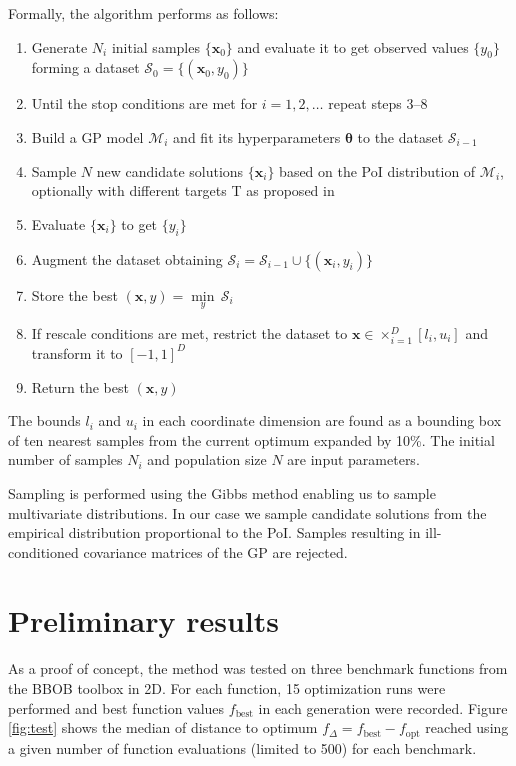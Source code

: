 \documentclass{sig-alternate}
\newcommand{\xx}{\mathrm{\mathbf{x}}}
\newcommand{\ttheta}{\mathbf{\theta}}
\begin{document}
Formally, the algorithm performs as follows:
\begin{enumerate}[itemsep=-4pt]
  \item Generate $N_i$ initial samples $\{\xx_0\}$ and evaluate it to get observed values $\{y_0\}$ forming a
    dataset $\mathcal{S}_0 = \{(\xx_0, y_0)\}$
  \item Until the stop conditions are met for $i = 1, 2, \dots$ repeat steps 3--8
  \item Build a GP model $\mathcal{M}_i$ and fit its hyperparameters $\ttheta$ to the dataset $\mathcal{S}_{i-1}$
  \item Sample $N$ new candidate solutions $\{\xx_i\}$ based on the PoI distribution of $\mathcal{M}_i$, 
    optionally with different targets T as proposed in \cite{jones01taxonomy}
  \item Evaluate $\{\xx_i\}$ to get $\{y_i\}$ 
  \item Augment the dataset obtaining $\mathcal{S}_i = \mathcal{S}_{i-1} \cup \{(\xx_i, y_i)\}$
  \item Store the best $(\xx, y) = \underset{y}{\min} \, \mathcal{S}_i$
  \item If rescale conditions are met, restrict the dataset to $\xx \in \times_{i=1}^D [l_i, u_i]$ and
    transform it to $[-1, 1]^D$
  \item Return the best $(\xx, y)$
\end{enumerate}
The bounds $l_i$ and $u_i$ in each coordinate dimension are found as a bounding box of ten nearest samples 
from the current optimum expanded by 10\%. The initial number of samples $N_i$ and population size $N$ are 
input parameters.

Sampling is performed using the Gibbs method \cite{geman1984stochastic} enabling us to sample multivariate 
distributions. In our case we sample candidate solutions from  the empirical distribution proportional to 
the PoI. Samples resulting in ill-con\-di\-tion\-ed covariance matrices of the GP are rejected.

\section{Preliminary results}

As a proof of concept, the method was tested on three benchmark functions from the BBOB toolbox \cite{hansen2012fun} 
in 2D. For each function, 15 optimization runs were performed and best function values 
$f_{\text{best}}$ in each generation were recorded. Figure \ref{fig:test} shows the median of distance to optimum 
$f_{\Delta} = f_{\text{best}} - f_{\text{opt}}$ reached using a given number of function evaluations (limited to 500)
for each benchmark.
\end{document}
